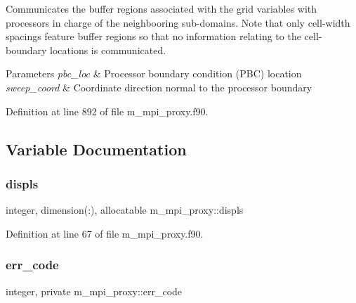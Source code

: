 Communicates the buffer regions associated with the grid variables with processors in charge of the neighbooring sub-\/domains. Note that only cell-\/width spacings feature buffer regions so that no information relating to the cell-\/boundary locations is communicated. 


\begin{DoxyParams}{Parameters}
{\em pbc\+\_\+loc} & Processor boundary condition (P\+BC) location \\
\hline
{\em sweep\+\_\+coord} & Coordinate direction normal to the processor boundary \\
\hline
\end{DoxyParams}


Definition at line 892 of file m\+\_\+mpi\+\_\+proxy.\+f90.



\subsection{Variable Documentation}
\mbox{\label{namespacem__mpi__proxy_aebaa6e3cc66d2431c5fb49896d40d7e6}} 
\subsubsection{\texorpdfstring{displs}{displs}}
{\footnotesize\ttfamily integer, dimension(\+:), allocatable m\+\_\+mpi\+\_\+proxy\+::displs}



Definition at line 67 of file m\+\_\+mpi\+\_\+proxy.\+f90.

\mbox{\label{namespacem__mpi__proxy_ae5709407e3600d19d79b183e409bb982}} 
\subsubsection{\texorpdfstring{err\+\_\+code}{err\_code}}
{\footnotesize\ttfamily integer, private m\+\_\+mpi\+\_\+proxy\+::err\+\_\+code\hspace{0.3cm}{\ttfamily [private]}}



